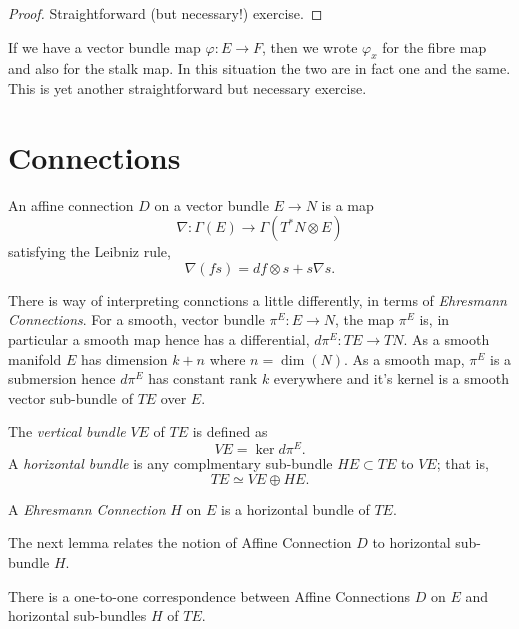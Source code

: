 \documentclass{amsart}
\begin{document}
\begin{proof}
Straightforward (but necessary!) exercise.
\end{proof}

\begin{rem}
If we have a vector bundle map \(\varphi : E \to F\), then we wrote \(\varphi_x\) for the fibre map and also for the stalk map. In this situation the two are in fact one and the same. This is yet another straightforward but necessary exercise.
\end{rem}

\section{Connections}

\begin{defn}
An affine connection \(D\) on a vector bundle \(E \to N\) is a map
\[
\nabla : \Gamma(E) \to \Gamma(T^{\ast} N \otimes E)
\]
satisfying the Leibniz rule,
\[
\nabla (f s) = df \otimes s + s \nabla s.
\]
\end{defn}

There is way of interpreting connctions a little differently, in terms of \emph{Ehresmann Connections}. For a smooth, vector bundle \(\pi^E : E \to N\), the map \(\pi^E\) is, in particular a smooth map hence has a differential, \(d\pi^E : TE \to TN\). As a smooth manifold \(E\) has dimension \(k+n\) where \(n = \operatorname{dim} (N)\). As a smooth map, \(\pi^E\) is a submersion hence \(d\pi^E\) has constant rank \(k\) everywhere and it's kernel is a smooth vector sub-bundle of \(TE\) over \(E\).

\begin{defn}
The \emph{vertical bundle} \(VE\) of \(TE\) is defined as
\[
VE = \operatorname{ker} d\pi^E.
\]
A \emph{horizontal bundle} is any complmentary sub-bundle \(HE \subset TE\) to \(VE\); that is,
\[
TE \simeq VE \oplus HE.
\]
\end{defn}

\begin{defn}
A \emph{Ehresmann Connection} \(H\) on \(E\) is a horizontal bundle of \(TE\).
\end{defn}

The next lemma relates the notion of Affine Connection \(D\) to horizontal sub-bundle \(H\).

\begin{lemma}
There is a one-to-one correspondence between Affine Connections \(D\) on \(E\) and horizontal sub-bundles \(H\) of \(TE\).
\end{lemma}
\end{document}
